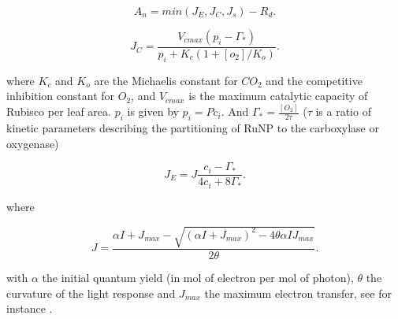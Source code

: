 \documentclass[a4paper,11pt]{article}
\begin{document}
\begin{equation}
\label{eq:An}
A_n= min(J_E, J_C, J_s) - R_d.
\end{equation}






\begin{equation}
\label{eq:JC}
J_C= \frac{V_{cmax} (p_i - \Gamma_*)}{p_i + K_c (1+[o_2]/K_o)}.
\end{equation}

where $K_c$ and $K_o$ are the Michaelis constant for $CO_2$ and the competitive inhibition constant for $O_2$, and $V_{cmax}$ is the maximum catalytic capacity of Rubisco per leaf area.
$p_i$ is given by $p_i = P c_i$. And $\Gamma_* = \frac{[O_2]}{2\tau}$ ($\tau$ is a ratio of kinetic parameters describing the partitioning of RuNP to the carboxylase or oxygenase)

\begin{equation}
\label{eq:JCb}
J_E = J \frac{ c_i - \Gamma_*}{4c_i + 8 \Gamma_*}.
\end{equation}

where

\begin{equation}
\label{eq:Jlight}
J = \frac{ \alpha I + J_{max} - \sqrt{(\alpha I + J_{max})^2 - 4 \theta \alpha I J_{max}}}{2\theta}.
\end{equation}

with $\alpha$ the initial quantum yield (in mol of electron per mol of photon), $\theta$ the curvature of the light response and $J_{max}$ the maximum electron transfer,
see for instance \citet{Bernacchi-2009}.
\end{document}
